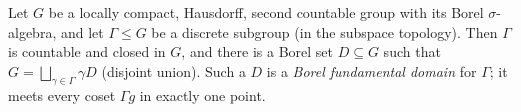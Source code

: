 Let $G$ be a locally compact, Hausdorff, second countable group with its Borel $\sigma$-algebra, and let $\Gamma\le G$ be
a discrete subgroup (in the subspace topology). Then $\Gamma$ is countable and closed in $G$, and there is a Borel set
$D\subseteq G$ such that $G=\bigsqcup_{\gamma\in\Gamma}\gamma D$ (disjoint union). Such a $D$ is a \emph{Borel
fundamental domain} for $\Gamma$; it meets every coset $\Gamma g$ in exactly one point.
